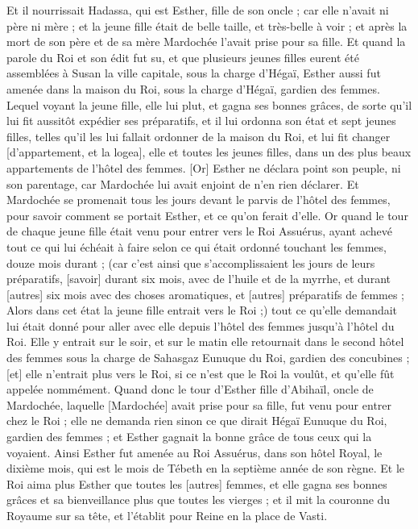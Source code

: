 \begin{multicols}{2}
Et il nourrissait Hadassa, qui est Esther, fille de son oncle ; car elle n'avait ni père ni mère ; et la jeune fille était de belle taille, et très-belle à voir ; et après la mort de son père et de sa mère Mardochée l'avait prise pour sa fille.
Et quand la parole du Roi et son édit fut su, et que plusieurs jeunes filles eurent été assemblées à Susan la ville capitale, sous la charge d'Hégaï, Esther aussi fut amenée dans la maison du Roi, sous la charge d'Hégaï, gardien des femmes.
Lequel voyant la jeune fille, elle lui plut, et gagna ses bonnes grâces, de sorte qu'il lui fit aussitôt expédier ses préparatifs, et il lui ordonna son état et sept jeunes filles, telles qu'il les lui fallait ordonner de la maison du Roi, et lui fit changer [d'appartement, et la logea], elle et toutes les jeunes filles, dans un des plus beaux appartements de l'hôtel des femmes.
[Or] Esther ne déclara point son peuple, ni son parentage, car Mardochée lui avait enjoint de n'en rien déclarer.
Et Mardochée se promenait tous les jours devant le parvis de l'hôtel des femmes, pour savoir comment se portait Esther, et ce qu'on ferait d'elle.
Or quand le tour de chaque jeune fille était venu pour entrer vers le Roi Assuérus, ayant achevé tout ce qui lui échéait à faire selon ce qui était ordonné touchant les femmes, douze mois durant ; (car c'est ainsi que s'accomplissaient les jours de leurs préparatifs, [savoir] durant six mois, avec de l'huile et de la myrrhe, et durant [autres] six mois avec des choses aromatiques, et [autres] préparatifs de femmes ;
Alors dans cet état la jeune fille entrait vers le Roi ;) tout ce qu'elle demandait lui était donné pour aller avec elle depuis l'hôtel des femmes jusqu'à l'hôtel du Roi.
Elle y entrait sur le soir, et sur le matin elle retournait dans le second hôtel des femmes sous la charge de Sahasgaz Eunuque du Roi, gardien des concubines ; [et] elle n'entrait plus vers le Roi, si ce n'est que le Roi la voulût, et qu'elle fût appelée nommément.
Quand donc le tour d'Esther fille d'Abihaïl, oncle de Mardochée, laquelle [Mardochée] avait prise pour sa fille, fut venu pour entrer chez le Roi ; elle ne demanda rien sinon ce que dirait Hégaï Eunuque du Roi, gardien des femmes ; et Esther gagnait la bonne grâce de tous ceux qui la voyaient.
Ainsi Esther fut amenée au Roi Assuérus, dans son hôtel Royal, le dixième mois, qui est le mois de Tébeth en la septième année de son règne.
Et le Roi aima plus Esther que toutes les [autres] femmes, et elle gagna ses bonnes grâces et sa bienveillance plus que toutes les vierges ; et il mit la couronne du Royaume sur sa tête, et l'établit pour Reine en la place de Vasti.

\end{multicols}
